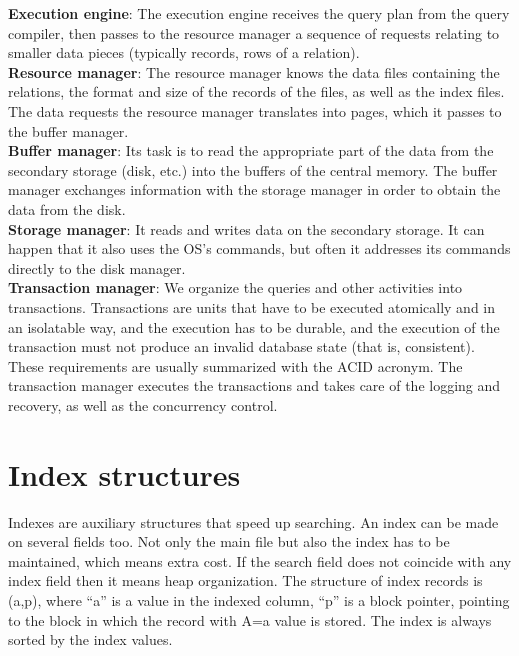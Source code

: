 \documentclass[margin=0px]{article}
\begin{document}
\noindent \textbf{Execution engine}: The execution engine receives the query plan from the query compiler, then passes to the resource manager a sequence of requests relating to smaller data pieces (typically records, rows of a relation).\\

\noindent \textbf{Resource manager}: The resource manager knows the data files containing the relations, the format and size of the records of the files, as well as the index files. The data requests the resource manager translates into pages, which it passes to the buffer manager.\\

\noindent \textbf{Buffer manager}: Its task is to read the appropriate part of the data from the secondary storage (disk, etc.) into the buffers of the central memory. The buffer manager exchanges information with the storage manager in order to obtain the data from the disk.\\

\noindent \textbf{Storage manager}: It reads and writes data on the secondary storage. It can happen that it also uses the OS's commands, but often it addresses its commands directly to the disk manager.\\

\noindent \textbf{Transaction manager}: We organize the queries and other activities into transactions. Transactions are units that have to be executed atomically and in an isolatable way, and the execution has to be durable, and the execution of the transaction must not produce an invalid database state (that is, consistent). These requirements are usually summarized with the ACID acronym. The transaction manager executes the transactions and takes care of the logging and recovery, as well as the concurrency control.\\

\section{Index structures}

Indexes are auxiliary structures that speed up searching. An index can be made on several fields too. Not only the
main file but also the index has to be maintained, which means extra cost. If the search field does not coincide with any
index field then it means heap organization. The structure of index records is (a,p), where
``a'' is a value in the indexed column, ``p'' is a block pointer, pointing to the block in which the record with A=a
value is stored. The index is always sorted by the index values.
\end{document}
